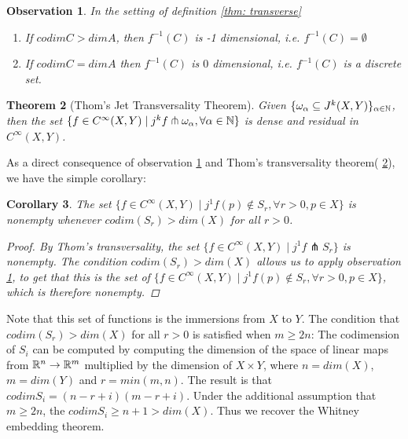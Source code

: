 \documentclass{article}
\newtheorem{theorem}{Theorem}[section]
\newtheorem{corollary}[theorem]{Corollary}
\newtheorem{proposed work}[theorem]{Proposed Work}
\newtheorem{observation}[theorem]{Observation}
\begin{document}
\begin{observation}\label{thm: dimensioncounting}
In the setting of definition \ref{thm: transverse}
\begin{enumerate}
\item If $codim C > dim A $, then $f^{-1}(C)$ is -1 dimensional, i.e. $f^{-1}(C)= \emptyset$
\item If $codim C  = dim A$ then $f^{-1}(C)$ is $0$ dimensional, i.e. $f^{-1}(C)$ is a discrete set.
\end{enumerate}
\end{observation}

\begin{theorem}[Thom's Jet Transversality Theorem]\label{thm: thomJT}
Given $\{\omega_\alpha \subseteq J^k(X,Y)\}_{\alpha \in \mathbb N}$, then the set $\{f \in C^\infty(X,Y) \mid j^kf \pitchfork \omega_\alpha, \forall \alpha \in \mathbb N\}$ is dense and residual in $C^\infty(X,Y)$.
\end{theorem}


As a direct consequence of observation \ref{thm: dimensioncounting} and Thom's transversality theorem( \ref{thm: thomJT}), we have the simple corollary:

\begin{corollary}\label{thm:jettransimm}
The set $\{f \in C^\infty(X,Y) \mid j^1f(p) \notin  S_r, \forall r>0, p \in X \}$ is nonempty whenever $codim(S_r) > dim(X)$ for all $r>0$. 
\begin{proof}
By Thom's transversality, the set $\{ f \in C^\infty(X,Y) \mid j^1f  \pitchfork S_r \}$ is nonempty.  The condition $codim(S_r) > dim(X)$ allows us to apply observation \ref{thm: dimensioncounting}, to get that this is the set of $\{f \in C^\infty(X,Y) \mid j^1f(p) \notin  S_r, \forall r>0, p \in X \}$, which is therefore nonempty.
\end{proof}

\end{corollary}
Note that this set of functions is the immersions from $X$ to $Y$.  The condition that $codim(S_r) > dim(X)$ for all $r>0$ is satisfied when $m \geq 2n$:
The codimension of $S_i$ can be computed by computing the dimension of the space of linear maps \label{howcomputedimension} from $\mathbb R^n \to \mathbb R^m$ multiplied by the dimension of $X \times Y$, where $n=dim(X)$, $m=dim(Y)$ and $r=min(m,n)$.  The result is that $codim S_i=(n-r+i)(m-r+i)$. Under the additional assumption that $m \geq 2n$, the $codim S_i \geq n+1> dim(X)$.  Thus we recover the Whitney embedding theorem.
\end{document}
